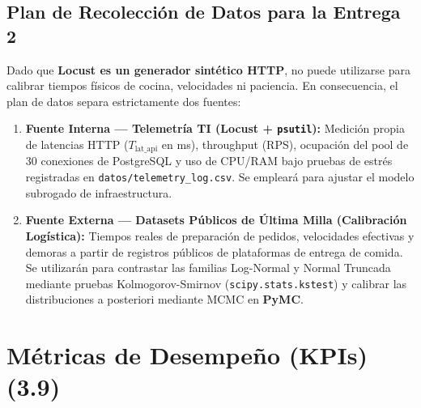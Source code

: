 \documentclass[11pt,letterpaper]{article}
\begin{document}
\subsection{Plan de Recolección de Datos para la Entrega 2}
Dado que \textbf{Locust es un generador sintético HTTP}, no puede utilizarse para calibrar tiempos físicos de cocina, velocidades ni paciencia. En consecuencia, el plan de datos separa estrictamente dos fuentes:
\begin{enumerate}[leftmargin=1.5em, itemsep=0.2em]
    \item \textbf{Fuente Interna — Telemetría TI (Locust + \texttt{psutil}):} Medición propia de latencias HTTP ($T_{\text{lat\_api}}$ en ms), throughput (RPS), ocupación del pool de 30 conexiones de PostgreSQL y uso de CPU/RAM bajo pruebas de estrés registradas en \texttt{datos/telemetry\_log.csv}. Se empleará para ajustar el modelo subrogado de infraestructura.
    \item \textbf{Fuente Externa — Datasets Públicos de Última Milla (Calibración Logística):} Tiempos reales de preparación de pedidos, velocidades efectivas y demoras a partir de registros públicos de plataformas de entrega de comida. Se utilizarán para contrastar las familias Log-Normal y Normal Truncada mediante pruebas Kolmogorov-Smirnov (\texttt{scipy.stats.kstest}) y calibrar las distribuciones a posteriori mediante MCMC en \textbf{PyMC}.
\end{enumerate}

\section{Métricas de Desempeño (KPIs) (3.9)}
\end{document}
